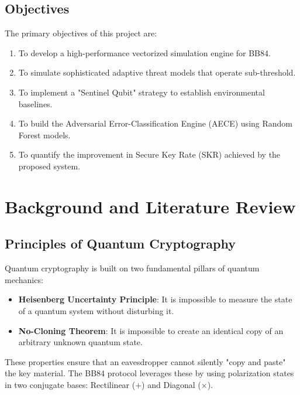 \documentclass[journal,onecolumn,12pt,draftclsnofoot]{IEEEtran}
\begin{document}
\subsection{Objectives}
The primary objectives of this project are:
\begin{enumerate}
    \item To develop a high-performance vectorized simulation engine for BB84.
    \item To simulate sophisticated adaptive threat models that operate sub-threshold.
    \item To implement a "Sentinel Qubit" strategy to establish environmental baselines.
    \item To build the Adversarial Error-Classification Engine (AECE) using Random Forest models.
    \item To quantify the improvement in Secure Key Rate (SKR) achieved by the proposed system.
\end{enumerate}

\newpage

\section{Background and Literature Review}

\subsection{Principles of Quantum Cryptography}
Quantum cryptography is built on two fundamental pillars of quantum mechanics:
\begin{itemize}
    \item \textbf{Heisenberg Uncertainty Principle}: It is impossible to measure the state of a quantum system without disturbing it.
    \item \textbf{No-Cloning Theorem}: It is impossible to create an identical copy of an arbitrary unknown quantum state.
\end{itemize}
These properties ensure that an eavesdropper cannot silently "copy and paste" the key material. The BB84 protocol leverages these by using polarization states in two conjugate bases: Rectilinear ($+$) and Diagonal ($\times$).
\end{document}

